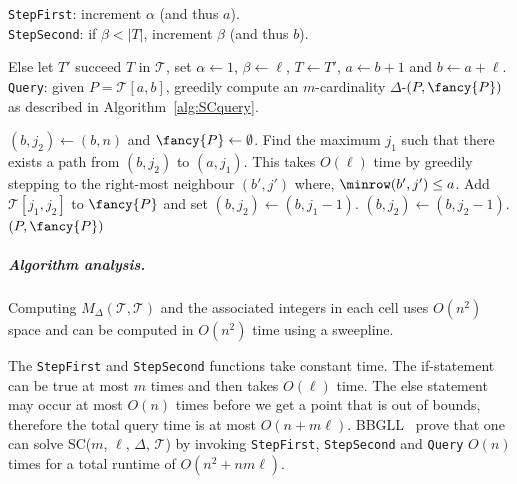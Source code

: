 \documentclass[english, thm-restate]{lipics-v2021}
\begin{document}
 \texttt{StepFirst}: increment $\alpha$ (and thus $a$).\\

\texttt{StepSecond}: if $\beta < |T|$, increment $\beta$ (and thus $b$). 


Else let $T'$ succeed $T$ in $\mathcal{T}$, set $\alpha \gets 1$, $\beta \gets \ell$, $T \gets T'$, $a \gets b + 1$ and $b \gets a + \ell$. \\

 \texttt{Query}: given $P = \mathcal{T}[a, b]$, greedily compute an $m$-cardinality $\Delta$-\pathlet $(P, {\fancy{P}})$ as {described in Algorithm~\ref{alg:SCquery}}. 


 \begin{algorithm}[h]
    \caption{\texttt{Query}($P = \mathcal{T}[a, b]$, $m$, $\ell$, $\Delta$, $\mathcal{T})$ by~\cite{buchin2011detecting}}
   \label{alg:SCquery}
    \begin{algorithmic}
    \State $(b, j_2) \gets (b, n)$ and ${\fancy{P}} \gets \emptyset$. 
    \State Find the maximum $j_1$ such that there exists a path from $(b, j_2)$ to $(a, j_1)$. 
    \State This takes $O(\ell)$ time by greedily stepping to the right-most neighbour 
    $(b', j')$ where,
    \State $\minrow(b', j') \leq a$.
    \State Add    
    $\mathcal{T}[j_1, j_2]$ to ${\fancy{P}}$ and set $(b, j_2) \gets (b, j_1 - 1)$.
    \Else 
    \State $(b, j_2) \gets (b, j_2 - 1)$. 
    \EndIf
    \EndWhile
   \State  \Return $(P, {\fancy{P}})$
    \EndIf
    \end{algorithmic}
  \end{algorithm}





 \subparagraph{Algorithm analysis.}
 Computing $M_\Delta(\mathcal{T}, \mathcal{T})$ and the associated integers in each cell uses $O(n^2)$ space and can be computed in $O(n^2)$ time using a sweepline. 

  The \texttt{StepFirst} and \texttt{StepSecond} functions take constant time. 
 The if-statement can be true at most $m$ times and then takes  $O(\ell)$ time. The else statement may occur at most $O(n)$ times before we get a point that is out of bounds, therefore the total query time  is at most $O(n + m \ell)$. 
 BBGLL~\cite{buchin2011detecting} prove that one can solve SC($m$, $\ell$, $\Delta$, $\mathcal{T}$) by invoking \texttt{StepFirst}, \texttt{StepSecond} and \texttt{Query} $O(n)$ times for a total runtime of $O(n^2 + n m \ell)$. 
 
\end{document}
